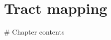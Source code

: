 \chapter{Tract mapping}
\label{chapterlabel4}

\begin{markdown}

  # Chapter contents

\end{markdown}